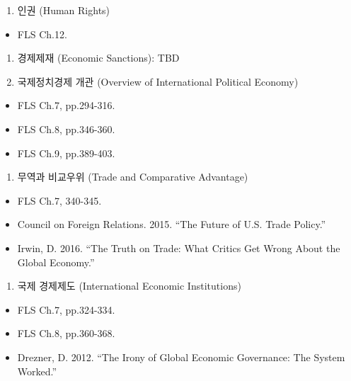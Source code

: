 \documentclass[]{book}
\providecommand{\tightlist}{%
  \setlength{\itemsep}{0pt}\setlength{\parskip}{0pt}}
\begin{document}
\begin{enumerate}
\def\labelenumi{\arabic{enumi}.}
\setcounter{enumi}{13}
\tightlist
\item
  인권 (Human Rights)
\end{enumerate}

\begin{itemize}
\tightlist
\item
  FLS Ch.12.
\end{itemize}

\begin{enumerate}
\def\labelenumi{\arabic{enumi}.}
\setcounter{enumi}{14}
\item
  경제제재 (Economic Sanctions): TBD
\item
  국제정치경제 개관 (Overview of International Political Economy)
\end{enumerate}

\begin{itemize}
\tightlist
\item
  FLS Ch.7, pp.294-316.
\item
  FLS Ch.8, pp.346-360.
\item
  FLS Ch.9, pp.389-403.
\end{itemize}

\begin{enumerate}
\def\labelenumi{\arabic{enumi}.}
\setcounter{enumi}{16}
\tightlist
\item
  무역과 비교우위 (Trade and Comparative Advantage)
\end{enumerate}

\begin{itemize}
\tightlist
\item
  FLS Ch.7, 340-345.
\item
  Council on Foreign Relations. 2015. ``The Future of U.S. Trade Policy.''
\item
  Irwin, D. 2016. ``The Truth on Trade: What Critics Get Wrong About the Global Economy.''
\end{itemize}

\begin{enumerate}
\def\labelenumi{\arabic{enumi}.}
\setcounter{enumi}{17}
\tightlist
\item
  국제 경제제도 (International Economic Institutions)
\end{enumerate}

\begin{itemize}
\tightlist
\item
  FLS Ch.7, pp.324-334.
\item
  FLS Ch.8, pp.360-368.
\item
  Drezner, D. 2012. ``The Irony of Global Economic Governance: The System Worked.''
\end{itemize}
\end{document}
